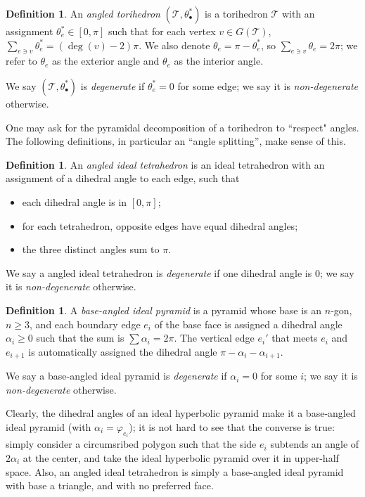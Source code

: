 \documentclass[11pt]{amsart}
\newcommand{\sT}{{\mathcal{T}}}
\newcommand{\vphi}{\varphi}
\theoremstyle{plain}
\theoremstyle{definition}
\newtheorem{define}[theorem]{Definition}
\newtheorem{definition}[theorem]{Definition}
\begin{document}
\begin{definition}
An \emph{angled torihedron} $(\sT, \theta_\bullet^*)$
is a torihedron $\sT$ with
an assignment $\theta_e^* \in [0,\pi]$
such that for each vertex $v \in G(\sT)$,
$\sum_{e \ni v} \theta_e^* = (\deg(v) - 2)\pi$.
We also denote $\theta_e = \pi - \theta_e^*$,
so $\sum_{e \ni v} \theta_e = 2\pi$;
we refer to $\theta_e$ as the exterior angle
and $\theta_e$ as the interior angle.


We say $(\sT, \theta_\bullet^*)$ is \emph{degenerate}
if $\theta_e^* = 0$ for some edge;
we say it is \emph{non-degenerate} otherwise.
\end{definition}


One may ask for the pyramidal decomposition of a torihedron
to ``respect" angles. The following definitions,
in particular an ``angle splitting'', make sense of this.

\begin{define}
An \emph{angled ideal tetrahedron} is an ideal tetrahedron with an assignment of a dihedral angle
to each edge, such that
\begin{itemize}
\item each dihedral angle is in $[0, \pi]$;
\item for each tetrahedron, opposite edges have equal dihedral angles;
\item the three distinct angles sum to $\pi$.
\end{itemize}

We say a angled ideal tetrahedron is \emph{degenerate} if
one dihedral angle is 0; we say it is \emph{non-degenerate} otherwise.
\end{define}


\begin{define}
A \emph{base-angled ideal pyramid}
is a pyramid whose base is an $n$-gon, $n \geq 3$,
and each boundary edge $e_i$ of the base face is assigned a dihedral angle
$\alpha_i \geq 0$ such that the sum is $\sum \alpha_i = 2\pi$.
The vertical edge $e_i'$ that meets $e_i$ and $e_{i+1}$
is automatically assigned the dihedral angle $\pi - \alpha_i - \alpha_{i+1}$.


We say a base-angled ideal pyramid is \emph{degenerate} if
$\alpha_i = 0$ for some $i$; we say it is \emph{non-degenerate} otherwise.
\end{define}


Clearly, the dihedral angles of an ideal hyperbolic pyramid
make it a base-angled ideal pyramid
(with $\alpha_i = \vphi_{e_i}$);
it is not hard to see that the converse is true:
simply consider a circumsribed polygon such that the side $e_i$
subtends an angle of $2\alpha_i$ at the center,
and take the ideal hyperbolic pyramid over it in upper-half space.
Also, an angled ideal tetrahedron is simply a base-angled ideal pyramid
with base a triangle, and with no preferred face.
\end{document}
